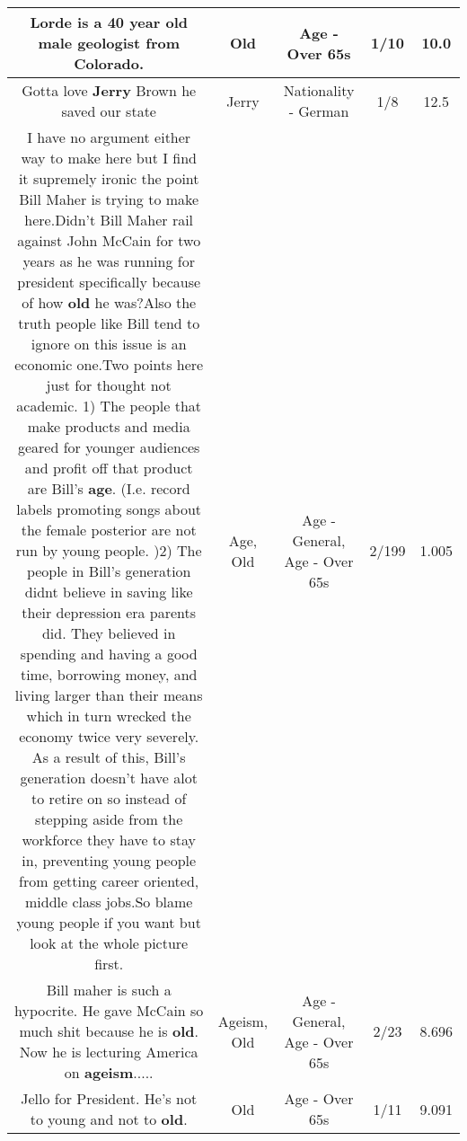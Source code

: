 \documentclass[11pt]{article}
\newlength\mylength
\begin{document}
\begin{center}
\begin{longtable}{|C{.65\mylength}|C{.30\mylength}|C{.12\mylength}|C{.12\mylength}|C{.12\mylength}|}
  \small Lorde is a 40 year \textbf{old} male geologist from Colorado.\normalsize   & Old & Age - Over 65s & 1/10 & 10.0 \\  \hline
  \small Gotta love \textbf{Jerry} Brown he saved our state\normalsize   & Jerry & Nationality - German & 1/8 & 12.5 \\  \hline
  \small I have no argument either way to make here but I find it supremely ironic the point Bill Maher is trying to make here.Didn't Bill Maher rail against John McCain for two years as he was running for president specifically because of how \textbf{old} he was?Also the truth people like Bill tend to ignore on this issue is an economic one.Two points here just for thought not academic. 1) The people that make products and media geared for younger audiences and profit off that product are Bill's \textbf{age}.  (I.e. record labels promoting songs about the female posterior are not run by young people. )2)  The people in Bill's generation didnt believe in saving like their depression era parents did.  They believed in spending and having a good time, borrowing money, and living larger than their means which in turn wrecked the economy twice very severely.   As a result of this, Bill's generation doesn't have alot to retire on so instead of stepping aside from the workforce they have to stay in, preventing young people from getting career oriented,  middle class jobs.So blame young people if you want but look at the whole picture first.\normalsize   & Age, Old & Age - General, Age - Over 65s & 2/199 & 1.005 \\  \hline
  \small Bill maher is such a hypocrite. He gave McCain so much shit because he is \textbf{old}. Now he is lecturing America on \textbf{ageism}.....\normalsize   & Ageism, Old & Age - General, Age - Over 65s & 2/23 & 8.696 \\  \hline
  \small Jello for President. He's not to young and not to \textbf{old}.\normalsize   & Old & Age - Over 65s & 1/11 & 9.091 \\  \hline

\end{longtable}
\end{center}
\end{document}
